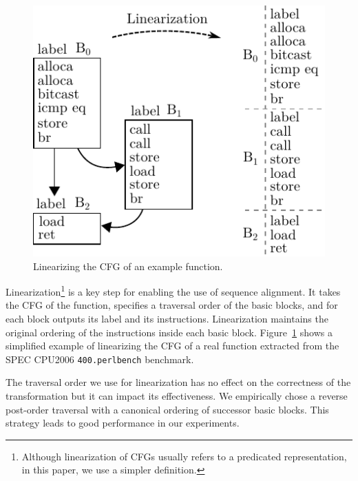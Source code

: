 \begin{figure}[t!]
  \centering
  \includegraphics[width=0.7\linewidth]{figs/linearization-example.pdf}
  \caption{Linearizing the CFG of an example function.}
  \label{fig:linearization-example}
\end{figure}

Linearization\footnote{Although linearization of CFGs
usually refers to a predicated representation, %
in this paper, we use a simpler definition.} is a key step for enabling the use of sequence alignment. It takes the CFG of the function,
specifies a traversal order of the basic blocks, and for each block outputs its label and its instructions. Linearization
maintains the original ordering of the instructions inside each basic block.
Figure~\ref{fig:linearization-example} shows a simplified example of linearizing the CFG of a
real function extracted from the SPEC CPU2006 \texttt{400.perlbench} benchmark.



The traversal order we use for linearization has no effect on the correctness of the transformation
but it can impact its effectiveness. We empirically chose a reverse post-order traversal with a
canonical ordering of successor basic blocks.
This strategy leads to good performance in our experiments.

